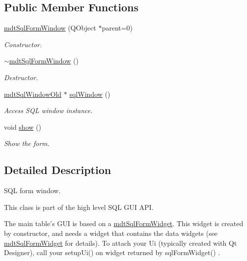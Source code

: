 \subsection*{Public Member Functions}
\begin{DoxyCompactItemize}
\item 
\hypertarget{classmdt_sql_form_window_a67149a8239b5918ef269d5ff0473813e}{
\hyperlink{classmdt_sql_form_window_a67149a8239b5918ef269d5ff0473813e}{mdtSqlFormWindow} (QObject $\ast$parent=0)}
\label{classmdt_sql_form_window_a67149a8239b5918ef269d5ff0473813e}

\begin{DoxyCompactList}\small\item\em Constructor. \end{DoxyCompactList}\item 
\hypertarget{classmdt_sql_form_window_a3399ae1660eeca90ccbf2132858d78c6}{
\hyperlink{classmdt_sql_form_window_a3399ae1660eeca90ccbf2132858d78c6}{$\sim$mdtSqlFormWindow} ()}
\label{classmdt_sql_form_window_a3399ae1660eeca90ccbf2132858d78c6}

\begin{DoxyCompactList}\small\item\em Destructor. \end{DoxyCompactList}\item 
\hyperlink{classmdt_sql_window_old}{mdtSqlWindowOld} $\ast$ \hyperlink{classmdt_sql_form_window_aa6960d4e87ff0ec12536a859ff72d9b4}{sqlWindow} ()
\begin{DoxyCompactList}\small\item\em Access SQL window instance. \end{DoxyCompactList}\item 
void \hyperlink{classmdt_sql_form_window_a659782b4223406d694f0bcd702f7c017}{show} ()
\begin{DoxyCompactList}\small\item\em Show the form. \end{DoxyCompactList}\end{DoxyCompactItemize}


\subsection{Detailed Description}
SQL form window. 

This class is part of the high level SQL GUI API.

The main table's GUI is based on a \hyperlink{classmdt_sql_form_widget}{mdtSqlFormWidget}. This widget is created by constructor, and needs a widget that contains the data widgets (see \hyperlink{classmdt_sql_form_widget}{mdtSqlFormWidget} for details). To attach your Ui (typically created with Qt Designer), call your setupUi() on widget returned by sqlFormWidget() .

